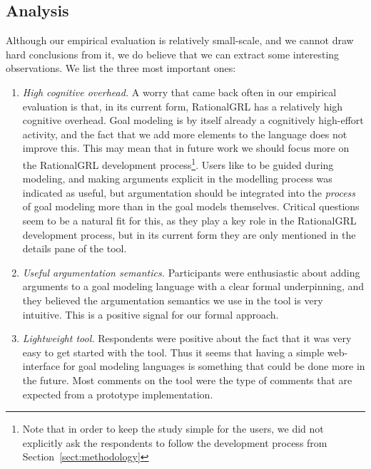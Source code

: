 \subsection{Analysis}\label{sec:eval-an}
Although our empirical evaluation is relatively small-scale, and we cannot draw hard conclusions from it, we do believe that we can extract some interesting observations. We list the three most important ones:
\begin{enumerate}
\item \emph{High cognitive overhead.} A worry that came back often in our empirical evaluation is that, in its current form, RationalGRL has a relatively high cognitive overhead. Goal modeling is by itself already a cognitively high-effort activity, and the fact that we add more elements to the language does not improve this. This may mean that in future work we should focus more on the RationalGRL development process\footnote{Note that in order to keep the study simple for the users, we did not explicitly ask the respondents to follow the development process from Section~\ref{sect:methodology}}. Users like to be guided during modeling, and making arguments explicit in the modelling process was indicated as useful, but argumentation should be integrated into the \emph{process} of goal modeling more than in the goal models themselves. Critical questions seem to be a natural fit for this, as they play a key role in the RationalGRL development process, but in its current form they are only mentioned in the details pane of the tool.
\item \emph{Useful argumentation semantics.} Participants were enthusiastic about adding arguments to a goal modeling language with a clear formal underpinning, and they believed the argumentation semantics we use in the tool is very intuitive. This is a positive signal for our formal approach.
\item \emph{Lightweight tool.} Respondents were positive about the fact that it was very easy to get started with the tool. Thus it seems that having a simple web-interface for goal modeling languages is something that could be done more in the future. Most comments on the tool were the type of comments that are expected from a prototype implementation.
\end{enumerate}